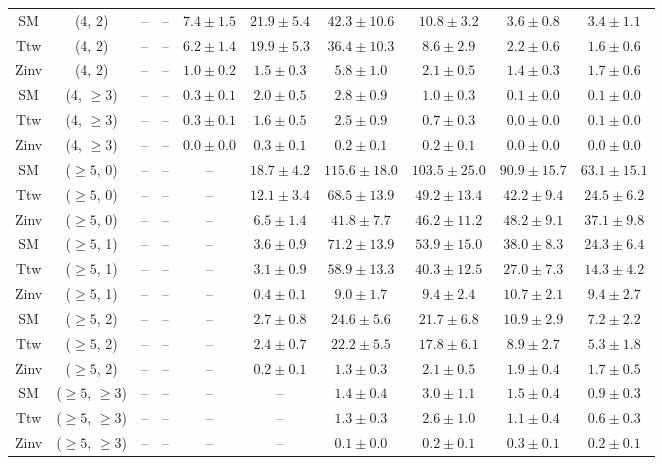 \begin{table}[h!]
{\begin{tabular}{cccccccccc}
	SM & (4, 2) & -- & -- & $7.4\pm 1.5$ & $21.9\pm 5.4$ & $42.3\pm 10.6$ & $10.8\pm 3.2$ & $3.6\pm 0.8$ & $3.4\pm 1.1$ \\[0.5ex] 
	Ttw & (4, 2) & -- & -- & $6.2\pm 1.4$ & $19.9\pm 5.3$ & $36.4\pm 10.3$ & $8.6\pm 2.9$ & $2.2\pm 0.6$ & $1.6\pm 0.6$ \\[0.5ex] 
	Zinv & (4, 2) & -- & -- & $1.0\pm 0.2$ & $1.5\pm 0.3$ & $5.8\pm 1.0$ & $2.1\pm 0.5$ & $1.4\pm 0.3$ & $1.7\pm 0.6$ \\[0.5ex] 
	SM & (4, $\ge3$) & -- & -- & $0.3\pm 0.1$ & $2.0\pm 0.5$ & $2.8\pm 0.9$ & $1.0\pm 0.3$ & $0.1\pm 0.0$ & $0.1\pm 0.0$ \\[0.5ex] 
	Ttw & (4, $\ge3$) & -- & -- & $0.3\pm 0.1$ & $1.6\pm 0.5$ & $2.5\pm 0.9$ & $0.7\pm 0.3$ & $0.0\pm 0.0$ & $0.1\pm 0.0$ \\[0.5ex] 
	Zinv & (4, $\ge3$) & -- & -- & $0.0\pm 0.0$ & $0.3\pm 0.1$ & $0.2\pm 0.1$ & $0.2\pm 0.1$ & $0.0\pm 0.0$ & $0.0\pm 0.0$ \\[0.5ex] 
	SM & ($\ge5$, 0) & -- & -- & -- & $18.7\pm 4.2$ & $115.6\pm 18.0$ & $103.5\pm 25.0$ & $90.9\pm 15.7$ & $63.1\pm 15.1$ \\[0.5ex] 
	Ttw & ($\ge5$, 0) & -- & -- & -- & $12.1\pm 3.4$ & $68.5\pm 13.9$ & $49.2\pm 13.4$ & $42.2\pm 9.4$ & $24.5\pm 6.2$ \\[0.5ex] 
	Zinv & ($\ge5$, 0) & -- & -- & -- & $6.5\pm 1.4$ & $41.8\pm 7.7$ & $46.2\pm 11.2$ & $48.2\pm 9.1$ & $37.1\pm 9.8$ \\[0.5ex] 
	SM & ($\ge5$, 1) & -- & -- & -- & $3.6\pm 0.9$ & $71.2\pm 13.9$ & $53.9\pm 15.0$ & $38.0\pm 8.3$ & $24.3\pm 6.4$ \\[0.5ex] 
	Ttw & ($\ge5$, 1) & -- & -- & -- & $3.1\pm 0.9$ & $58.9\pm 13.3$ & $40.3\pm 12.5$ & $27.0\pm 7.3$ & $14.3\pm 4.2$ \\[0.5ex] 
	Zinv & ($\ge5$, 1) & -- & -- & -- & $0.4\pm 0.1$ & $9.0\pm 1.7$ & $9.4\pm 2.4$ & $10.7\pm 2.1$ & $9.4\pm 2.7$ \\[0.5ex] 
	SM & ($\ge5$, 2) & -- & -- & -- & $2.7\pm 0.8$ & $24.6\pm 5.6$ & $21.7\pm 6.8$ & $10.9\pm 2.9$ & $7.2\pm 2.2$ \\[0.5ex] 
	Ttw & ($\ge5$, 2) & -- & -- & -- & $2.4\pm 0.7$ & $22.2\pm 5.5$ & $17.8\pm 6.1$ & $8.9\pm 2.7$ & $5.3\pm 1.8$ \\[0.5ex] 
	Zinv & ($\ge5$, 2) & -- & -- & -- & $0.2\pm 0.1$ & $1.3\pm 0.3$ & $2.1\pm 0.5$ & $1.9\pm 0.4$ & $1.7\pm 0.5$ \\[0.5ex] 
	SM & ($\ge5$, $\ge3$) & -- & -- & -- & -- & $1.4\pm 0.4$ & $3.0\pm 1.1$ & $1.5\pm 0.4$ & $0.9\pm 0.3$ \\[0.5ex] 
	Ttw & ($\ge5$, $\ge3$) & -- & -- & -- & -- & $1.3\pm 0.3$ & $2.6\pm 1.0$ & $1.1\pm 0.4$ & $0.6\pm 0.3$ \\[0.5ex] 
	Zinv & ($\ge5$, $\ge3$) & -- & -- & -- & -- & $0.1\pm 0.0$ & $0.2\pm 0.1$ & $0.3\pm 0.1$ & $0.2\pm 0.1$ \\[0.5ex] 
	\hline
	\hline
\end{tabular}}
\end{table}
